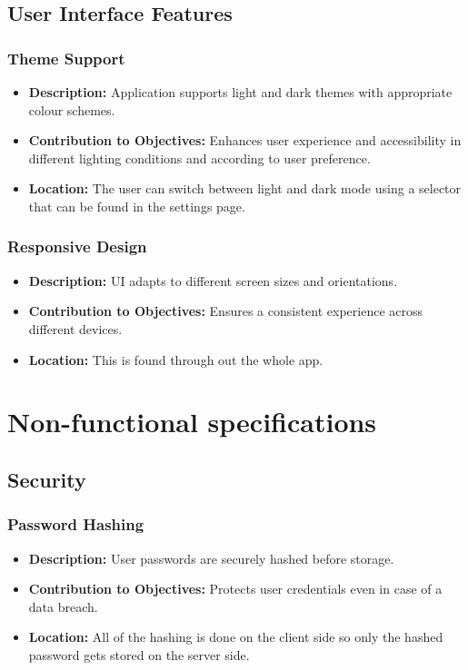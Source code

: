 \subsection{User Interface Features}
\subsubsection{Theme Support}
\begin{itemize}
    \item \textbf{Description:} Application supports light and dark themes with appropriate colour schemes.
    \item \textbf{Contribution to Objectives:} Enhances user experience and accessibility in different lighting conditions and according to user preference.
    \item \textbf{Location:} The user can switch between light and dark mode using a selector that can be found in the settings page.
\end{itemize}

\subsubsection{Responsive Design}
\begin{itemize}
    \item \textbf{Description:} UI adapts to different screen sizes and orientations.
    \item \textbf{Contribution to Objectives:} Ensures a consistent experience across different devices.
    \item \textbf{Location:} This is found through out the whole app.
\end{itemize}

\section{Non-functional specifications}
\subsection{Security}
\subsubsection{Password Hashing}
\begin{itemize}
    \item \textbf{Description:} User passwords are securely hashed before storage.
    \item \textbf{Contribution to Objectives:} Protects user credentials even in case of a data breach.
    \item \textbf{Location:} All of the hashing is done on the client side so only the hashed password gets stored on the server side.
\end{itemize}

